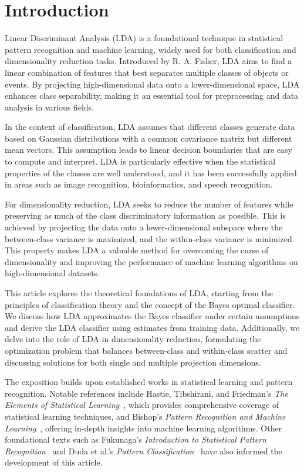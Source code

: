 \section{Introduction}

Linear Discriminant Analysis (LDA) is a foundational technique in statistical pattern recognition and machine learning, widely used for both classification and dimensionality reduction tasks. Introduced by R. A. Fisher, LDA aims to find a linear combination of features that best separates multiple classes of objects or events. By projecting high-dimensional data onto a lower-dimensional space, LDA enhances class separability, making it an essential tool for preprocessing and data analysis in various fields.

In the context of classification, LDA assumes that different classes generate data based on Gaussian distributions with a common covariance matrix but different mean vectors. This assumption leads to linear decision boundaries that are easy to compute and interpret. LDA is particularly effective when the statistical properties of the classes are well understood, and it has been successfully applied in areas such as image recognition, bioinformatics, and speech recognition.

For dimensionality reduction, LDA seeks to reduce the number of features while preserving as much of the class discriminatory information as possible. This is achieved by projecting the data onto a lower-dimensional subspace where the between-class variance is maximized, and the within-class variance is minimized. This property makes LDA a valuable method for overcoming the curse of dimensionality and improving the performance of machine learning algorithms on high-dimensional datasets.

This article explores the theoretical foundations of LDA, starting from the principles of classification theory and the concept of the Bayes optimal classifier. We discuss how LDA approximates the Bayes classifier under certain assumptions and derive the LDA classifier using estimates from training data. Additionally, we delve into the role of LDA in dimensionality reduction, formulating the optimization problem that balances between-class and within-class scatter and discussing solutions for both single and multiple projection dimensions.

The exposition builds upon established works in statistical learning and pattern recognition. Notable references include Hastie, Tibshirani, and Friedman's \emph{The Elements of Statistical Learning}~\cite{hastie2009elements}, which provides comprehensive coverage of statistical learning techniques, and Bishop's \emph{Pattern Recognition and Machine Learning}~\cite{bishop2006pattern}, offering in-depth insights into machine learning algorithms. Other foundational texts such as Fukunaga's \emph{Introduction to Statistical Pattern Recognition}~\cite{fukunaga1990introduction} and Duda et al.'s \emph{Pattern Classification}~\cite{duda2012pattern} have also informed the development of this article.
